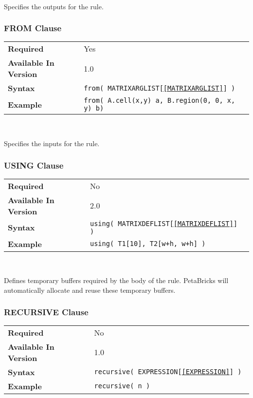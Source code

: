 \documentclass[11pt]{article}
\begin{document}
~

\noindent Specifies the outputs for the rule.

\subsubsection{FROM Clause}
\label{FROM}
\begin{tabular}{| l | l |}
\hline
\bf Required & Yes                          \\
\bf Available In Version & 1.0             \\
\bf Syntax & \tt from( MATRIXARGLIST[\ref{MATRIXARGLIST}] ) \\
\bf Example & \tt from( A.cell(x,y) a, B.region(0, 0, x, y) b)\\
\hline
\end{tabular}

~

\noindent Specifies the inputs for the rule.

\subsubsection{USING Clause}
\label{USING}
\begin{tabular}{| l | l |}
\hline
\bf Required & No \\
\bf Available In Version & 2.0             \\
\bf Syntax & \tt using( MATRIXDEFLIST[\ref{MATRIXDEFLIST}] ) \\
\bf Example & \tt using( T1[10], T2[w+h, w+h] ) \\
\hline
\end{tabular}

~

\noindent Defines temporary buffers required by the body of the rule.
PetaBricks will automatically allocate and reuse these temporary buffers.

\subsubsection{RECURSIVE Clause}
\begin{tabular}{| l | l |}
\hline
\bf Required & No \\
\bf Available In Version & 1.0             \\
\bf Syntax & \tt recursive( EXPRESSION[\ref{EXPRESSION}] )   \\
\bf Example & \tt recursive( n )           \\
\hline
\end{tabular}
\end{document}
